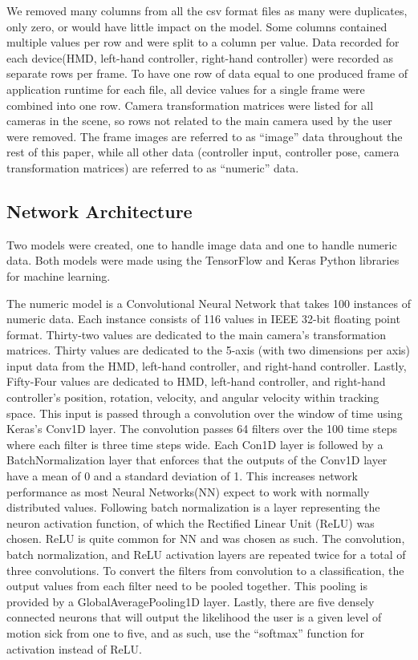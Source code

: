 We removed many columns from all the csv format files as many were duplicates, only zero, or would have little impact on the model.
Some columns contained multiple values per row and were split to a column per value.
Data recorded for each device(HMD, left-hand controller, right-hand controller) were recorded as separate rows per frame.
To have one row of data equal to one produced frame of application runtime for each file, all device values for a single frame were combined into one row.
Camera transformation matrices were listed for all cameras in the scene, so rows not related to the main camera used by the user were removed.
The frame images are referred to as ``image'' data throughout the rest of this paper, while all other data (controller input, controller pose, camera transformation matrices) are referred to as ``numeric'' data.

\subsection{Network Architecture}
\label{subsec:architecture}

Two models were created, one to handle image data and one to handle numeric data.
Both models were made using the TensorFlow and Keras Python libraries for machine learning.

The numeric model is a Convolutional Neural Network that takes 100 instances of numeric data.
Each instance consists of 116 values in IEEE 32-bit floating point format.
Thirty-two values are dedicated to the main camera's transformation matrices.
Thirty values are dedicated to the 5-axis (with two dimensions per axis) input data from the HMD, left-hand controller, and right-hand controller.
Lastly, Fifty-Four values are dedicated to HMD, left-hand controller, and right-hand controller's position, rotation, velocity, and angular velocity within tracking space.
This input is passed through a convolution over the window of time using Keras's Conv1D layer.
The convolution passes 64 filters over the 100 time steps where each filter is three time steps wide.
Each Con1D layer is followed by a BatchNormalization layer that enforces that the outputs of the Conv1D layer have a mean of 0 and a standard deviation of 1.
This increases network performance as most Neural Networks(NN) expect to work with normally distributed values.
Following batch normalization is a layer representing the neuron activation function, of which the Rectified Linear Unit (ReLU) was chosen.
ReLU is quite common for NN and was chosen as such.
The convolution, batch normalization, and ReLU activation layers are repeated twice for a total of three convolutions.
To convert the filters from convolution to a classification, the output values from each filter need to be pooled together.
This pooling is provided by a GlobalAveragePooling1D layer.
Lastly, there are five densely connected neurons that will output the likelihood the user is a given level of motion sick from one to five, and as such, use the ``softmax'' function for activation instead of ReLU\@.

